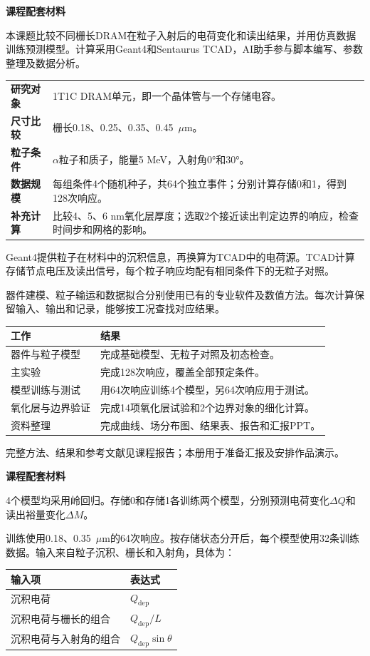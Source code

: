 \documentclass[UTF8,fontset=fandol,11pt,a4paper]{ctexart}
\newcommand{\titleline}[1]{{\small\bfseries\color{blue}课程配套材料}\par\vspace{6pt}{\LARGE\bfseries #1}\par\vspace{8pt}}
\newcommand{\parttitle}[1]{\par\vspace{10pt}{\large\bfseries #1}\par\vspace{3pt}}
\newcommand{\smallnote}[1]{\par{\small\color{muted}#1}\par}
\begin{document}
\titleline{设计方案与工作进度}
本课题比较不同栅长DRAM在粒子入射后的电荷变化和读出结果，并用仿真数据训练预测模型。计算采用Geant4和Sentaurus TCAD，AI助手参与脚本编写、参数整理及数据分析。

\parttitle{研究安排}
\begin{tabularx}{\textwidth}{@{}>{\bfseries}p{2.3cm}X@{}}
\toprule
研究对象 & 1T1C DRAM单元，即一个晶体管与一个存储电容。\\
尺寸比较 & 栅长0.18、0.25、0.35、0.45~$\mu$m。\\
粒子条件 & $\alpha$粒子和质子，能量5 MeV，入射角0°和30°。\\
数据规模 & 每组条件4个随机种子，共64个独立事件；分别计算存储0和1，得到128次响应。\\
补充计算 & 比较4、5、6 nm氧化层厚度；选取2个接近读出判定边界的响应，检查时间步和网格的影响。\\
\bottomrule
\end{tabularx}

\parttitle{计算方法}
Geant4提供粒子在材料中的沉积信息，再换算为TCAD中的电荷源。TCAD计算存储节点电压及读出信号，每个粒子响应均配有相同条件下的无粒子对照。

器件建模、粒子输运和数据拟合分别使用已有的专业软件及数值方法。每次计算保留输入、输出和记录，能够按工况查找对应结果。

\parttitle{已完成进度}
\begin{tabularx}{\textwidth}{@{}p{3.8cm}X@{}}
\toprule
工作 & 结果\\\midrule
器件与粒子模型 & 完成基础模型、无粒子对照及初态检查。\\
主实验 & 完成128次响应，覆盖全部预定条件。\\
模型训练与测试 & 用64次响应训练4个模型，另64次响应用于测试。\\
氧化层与边界验证 & 完成14项氧化层试验和2个边界对象的细化计算。\\
资料整理 & 完成曲线、场分布图、结果表、报告和汇报PPT。\\
\bottomrule
\end{tabularx}
\vfill
\smallnote{完整方法、结果和参考文献见课程报告；本册用于准备汇报及安排作品演示。}

\newpage
\titleline{预测模型的训练与验证}
4个模型均采用岭回归。存储0和存储1各训练两个模型，分别预测电荷变化$\Delta Q$和读出裕量变化$\Delta M$。

\parttitle{训练数据与输入}
训练使用0.18、0.35~$\mu$m的64次响应。按存储状态分开后，每个模型使用32条训练数据。输入来自粒子沉积、栅长和入射角，具体为：
\begin{center}
\begin{tabular}{ll}\toprule
输入项 & 表达式\\\midrule
沉积电荷 & $Q_{\mathrm{dep}}$\\
沉积电荷与栅长的组合 & $Q_{\mathrm{dep}}/L$\\
沉积电荷与入射角的组合 & $Q_{\mathrm{dep}}\sin\theta$\\\bottomrule
\end{tabular}
\end{center}
\end{document}
